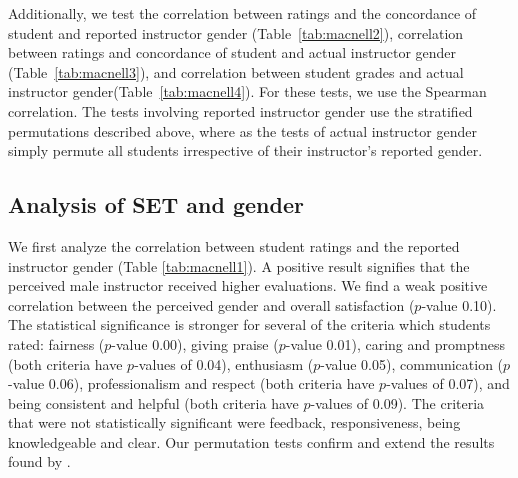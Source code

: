 \documentclass[12pt]{article}
\begin{document}
Additionally, we test the correlation between ratings and the concordance of student and reported instructor gender (Table~\ref{tab:macnell2}), correlation between ratings and concordance of student and actual instructor gender (Table~\ref{tab:macnell3}), and correlation between student grades and actual instructor gender(Table~\ref{tab:macnell4}).  For these tests, we use the Spearman correlation.  The tests involving reported instructor gender use the stratified permutations described above, where as the tests of actual instructor gender simply permute all students irrespective of their instructor's reported gender.

\subsection{Analysis of SET and gender}
We first analyze the correlation between student ratings and the reported instructor gender (Table \ref{tab:macnell1}). A positive result signifies that the perceived male instructor received higher evaluations. We find a weak positive correlation between the perceived gender and overall satisfaction ($p$-value 0.10). The statistical significance is stronger for several of the criteria which students rated: fairness ($p$-value 0.00), giving praise ($p$-value 0.01), caring and promptness (both criteria have $p$-values of 0.04), enthusiasm ($p$-value 0.05), communication ($p$-value 0.06), professionalism and respect (both criteria have $p$-values of 0.07), and being consistent and helpful (both criteria have $p$-values of 0.09). The criteria that were not statistically significant were feedback, responsiveness, being knowledgeable and clear. Our permutation tests confirm and extend the results found by \citet{MacNell2014}.
\end{document}
